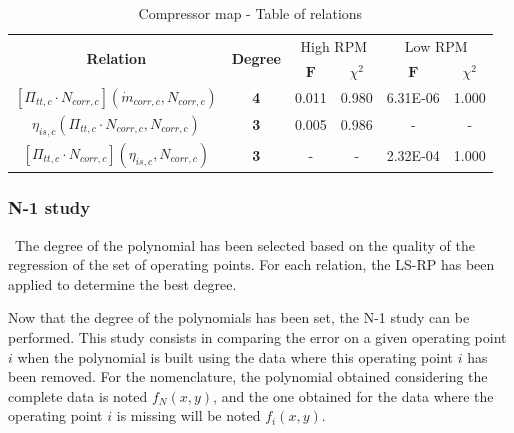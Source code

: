 \begin{longtable}[c]{@{}cccc|cc@{}}
\caption{Compressor map - Table of relations}
\label{tab:C7_compmaprel}\\
\toprule
\multicolumn{1}{c}{\multirow{2}{*}{\textbf{Relation}}} & \multicolumn{1}{c}{\multirow{2}{*}{\textbf{Degree}}} & \multicolumn{2}{c|}{High RPM}                  & \multicolumn{2}{c}{Low RPM}                   \\
\multicolumn{1}{c}{}                                            & \multicolumn{1}{c}{}                        & \multicolumn{1}{c}{$\mathbf{F}$}          & \multicolumn{1}{c|}{$\chi^2$}               & \multicolumn{1}{c}{$\mathbf{F}$}          & \multicolumn{1}{c}{$\chi^2$}               \\* \midrule
\endfirsthead
%
\endhead
%
\bottomrule
\endfoot
%
\endlastfoot
%
$[\Pi_{tt,c}\cdot N_{corr,c}](\dot{m}_{corr,c},N_{corr,c})$                   & \multicolumn{1}{c}{\textbf{4}}                                           & 0.011
                 & 0.980
                  & 6.31E-06
      & 1.000                 \\
$\eta_{is,c}(\Pi_{tt,c}\cdot N_{corr,c},N_{corr,c})$                          & \multicolumn{1}{c}{\textbf{3}}                                           & 0.005             & 0.986                  & \multicolumn{1}{c}{-} & \multicolumn{1}{c}{-} \\
$[\Pi_{tt,c}\cdot N_{corr,c}](\eta_{is,c},N_{corr,c})$                        & \multicolumn{1}{c}{\textbf{3}}                                           & \multicolumn{1}{c}{-} & \multicolumn{1}{c|}{-} & 2.32E-04              & 1.000                 \\* \bottomrule
\end{longtable}

\subsubsection{N-1 study}
\quad\ The degree of the polynomial has been selected based on the quality of the regression of the set of operating points. For each relation, the LS-RP has been applied to determine the best degree.

Now that the degree of the polynomials has been set, the N-1 study can be performed. This study consists in comparing the error on a given operating point $i$ when the polynomial is built using the data where this operating point $i$ has been removed. For the nomenclature, the polynomial obtained considering the complete data is noted $f_N(x,y)$, and the one obtained for the data where the operating point $i$ is missing will be noted $f_i(x,y)$.

